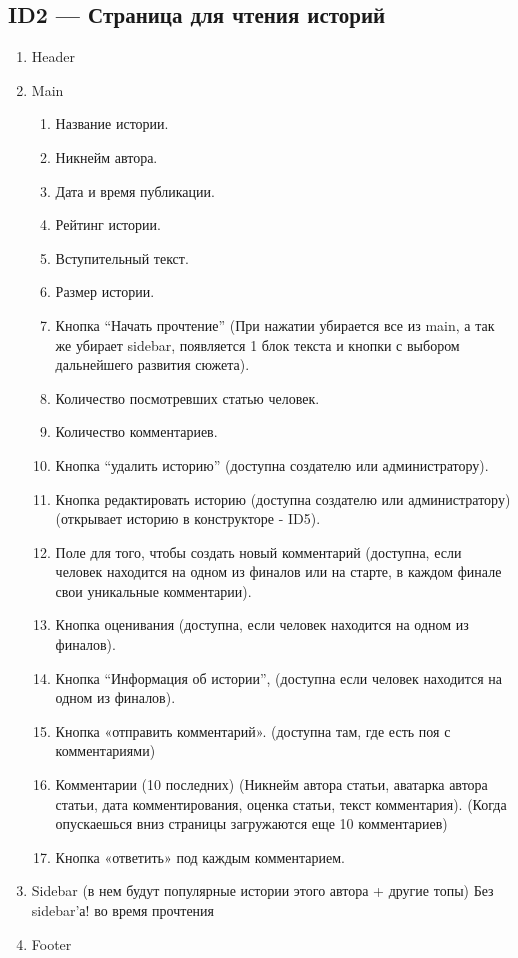 \documentclass[a4paper]{article}
\begin{document}
		\subsection{ID2 --- Страница для чтения историй}
			\begin{enumerate}
				\item Header
				\item Main
				\begin{enumerate}
					\item Название истории.
					\item Никнейм автора.
					\item Дата и время публикации.
					\item Рейтинг истории.
					\item Вступительный текст.
					\item Размер истории.
					\item Кнопка ``Начать прочтение'' (При нажатии убирается все из main, а так же убирает sidebar, появляется 1 блок текста и кнопки с выбором дальнейшего развития сюжета).
					\item Количество посмотревших статью человек.
					\item Количество комментариев.
					\item Кнопка ``удалить историю'' (доступна создателю или администратору).
					\item Кнопка редактировать историю (доступна создателю или администратору) (открывает историю в конструкторе - ID5).
					\item Поле для того, чтобы создать новый комментарий (доступна, если человек находится на одном из финалов или на старте, в каждом финале свои уникальные комментарии).
					\item Кнопка оценивания (доступна, если человек находится на одном из финалов).
					\item Кнопка “Информация об истории”, (доступна если человек находится на одном из финалов).
					\item Кнопка «отправить комментарий». (доступна там, где есть поя с комментариями)
					\item Комментарии (10 последних) (Никнейм автора статьи, аватарка автора статьи, дата комментирования, оценка статьи, текст комментария). (Когда опускаешься вниз страницы загружаются еще 10 комментариев)
					\item Кнопка «ответить» под каждым комментарием.
				\end{enumerate}
				\item Sidebar (в нем будут популярные истории этого автора + другие топы) Без sidebar’а! во время прочтения
				\item Footer
			\end{enumerate}
\end{document}

